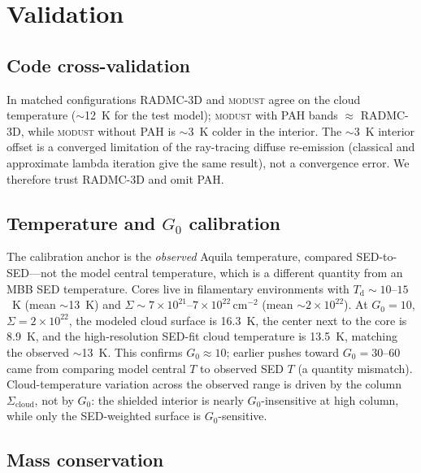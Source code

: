 \documentclass[11pt,a4paper]{article}
\newcommand{\Scloud}{\Sigma_{\mathrm{cloud}}}
\begin{document}
\section{Validation}

\subsection{Code cross-validation}
\label{sec:crossval}

In matched configurations RADMC-3D and \textsc{modust} agree on the cloud
temperature ($\sim$12~K for the test model); \textsc{modust} with PAH bands
$\approx$ RADMC-3D, while \textsc{modust} without PAH is $\sim$3~K colder in
the interior. The $\sim$3~K interior offset is a converged limitation of the
ray-tracing diffuse re-emission (classical and approximate lambda iteration
give the same result), not a convergence error. We therefore trust
RADMC-3D and omit PAH. 

\subsection{Temperature and $G_{0}$ calibration}
\label{sec:tcalib}

The calibration anchor is the \emph{observed} Aquila temperature, compared
SED-to-SED---not the model central temperature, which is a different
quantity from an MBB SED temperature. Cores live in filamentary
environments with $T_{\mathrm d}\sim 10$--$15$~K (mean $\sim$13~K) and
$\Sigma\sim 7\times10^{21}$--$7\times10^{22}\,\mathrm{cm^{-2}}$
(mean $\sim 2\times10^{22}$). At $G_{0}=10$, $\Sigma=2\times10^{22}$, the
modeled cloud surface is 16.3~K, the center next to the core is 8.9~K, and
the high-resolution SED-fit cloud temperature is 13.5~K, matching the
observed $\sim$13~K. This confirms $G_{0}\approx 10$; earlier pushes toward
$G_{0}=30$--$60$ came from comparing model central $T$ to observed SED $T$
(a quantity mismatch). Cloud-temperature variation across the observed range
is driven by the column $\Scloud$, not by $G_{0}$: the shielded interior is
nearly $G_{0}$-insensitive at high column, while only the SED-weighted
surface is $G_{0}$-sensitive.

\subsection{Mass conservation}
\end{document}
